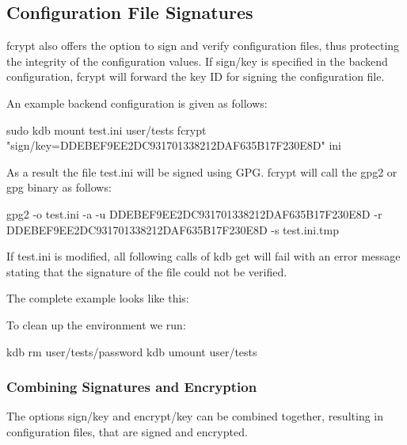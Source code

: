 \subsection*{Configuration File Signatures}

{\ttfamily fcrypt} also offers the option to sign and verify configuration files, thus protecting the integrity of the configuration values. If {\ttfamily sign/key} is specified in the backend configuration, {\ttfamily fcrypt} will forward the key ID for signing the configuration file.

An example backend configuration is given as follows\+:


\begin{DoxyCode}
sudo kdb mount test.ini user/tests fcrypt "sign/key=DDEBEF9EE2DC931701338212DAF635B17F230E8D" ini
\end{DoxyCode}


As a result the file {\ttfamily test.\+ini} will be signed using G\+PG. {\ttfamily fcrypt} will call the {\ttfamily gpg2} or {\ttfamily gpg} binary as follows\+:


\begin{DoxyCode}
gpg2 -o test.ini -a -u DDEBEF9EE2DC931701338212DAF635B17F230E8D -r DDEBEF9EE2DC931701338212DAF635B17F230E8D
       -s test.ini.tmp
\end{DoxyCode}


If {\ttfamily test.\+ini} is modified, all following calls of {\ttfamily kdb get} will fail with an error message stating that the signature of the file could not be verified.

The complete example looks like this\+:




To clean up the environment we run\+:


\begin{DoxyCode}
kdb rm user/tests/password
kdb umount user/tests
\end{DoxyCode}


\subsubsection*{Combining Signatures and Encryption}

The options {\ttfamily sign/key} and {\ttfamily encrypt/key} can be combined together, resulting in configuration files, that are signed and encrypted.

